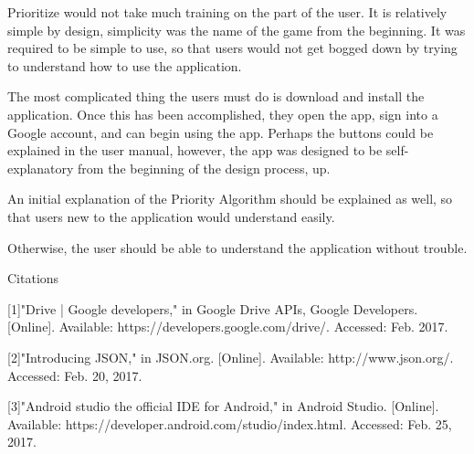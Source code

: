 \documentclass[12pt]{article}
\begin{document}
Prioritize would not take much training on the part of the user. It is relatively simple by design, simplicity was the name of the game from the beginning. It was required to be simple to use, so that users would not get bogged down by trying to understand how to use the application.

The most complicated thing the users must do is download and install the application. Once this has been accomplished, they open the app, sign into a Google account, and can begin using the app. Perhaps the buttons could be explained in the user manual, however, the app was designed to be self-explanatory from the beginning of the design process, up. 

An initial explanation of the Priority Algorithm should be explained as well, so that users new to the application would understand easily.

Otherwise, the user should be able to understand the application without trouble.


\newpage



Citations

[1]"Drive | Google developers," in Google Drive APIs, Google Developers. [Online]. Available: https://developers.google.com/drive/. Accessed: Feb. 2017.


[2]"Introducing JSON," in JSON.org. [Online]. Available: http://www.json.org/. Accessed: Feb. 20, 2017.


[3]"Android studio the official IDE for Android," in Android Studio. [Online]. Available: https://developer.android.com/studio/index.html. Accessed: Feb. 25, 2017.
\end{document}

